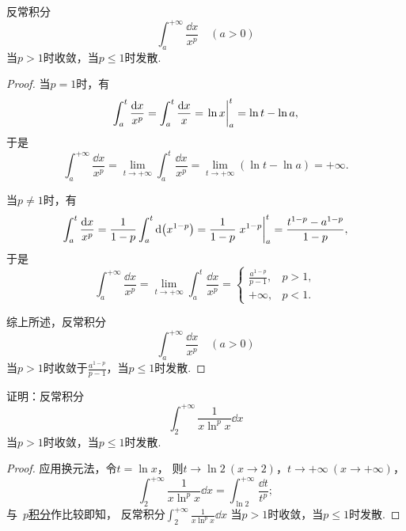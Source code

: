 \begin{proposition}[\(p\)积分]\label{example:定积分.p积分}
反常积分\begin{equation*}
	\int_a^{+\infty} \frac{\dd{x}}{x^p}
	\quad(a>0)
\end{equation*}当\(p>1\)时收敛，当\(p\leq1\)时发散.
\begin{proof}
当\(p=1\)时，有\begin{equation*}
	\int_a^t \frac{\dd{x}}{x^p}
	= \int_a^t \frac{\dd{x}}{x}
	= \eval{\ln x}_a^t
	= \ln t - \ln a,
\end{equation*}
于是\begin{equation*}
	\int_a^{+\infty} \frac{\dd{x}}{x^p}
	= \lim_{t\to+\infty} \int_a^t \frac{\dd{x}}{x^p}
	= \lim_{t\to+\infty} (\ln t - \ln a)
	= +\infty.
\end{equation*}

当\(p\neq1\)时，有\begin{equation*}
	\int_a^t \frac{\dd{x}}{x^p}
	= \frac{1}{1-p} \int_a^t \dd(x^{1-p})
	= \frac{1}{1-p} \eval{x^{1-p}}_a^t
	= \frac{t^{1-p}-a^{1-p}}{1-p},
\end{equation*}
于是\begin{equation*}
	\int_a^{+\infty} \frac{\dd{x}}{x^p}
	= \lim_{t\to+\infty} \int_a^t \frac{\dd{x}}{x^p}
	= \left\{ \begin{array}{cl}
		\frac{a^{1-p}}{p-1}, & p>1, \\
		+\infty, & p<1.
	\end{array} \right.
\end{equation*}

综上所述，反常积分\begin{equation*}
	\int_a^{+\infty} \frac{\dd{x}}{x^p}
	\quad(a>0)
\end{equation*}当\(p>1\)时收敛于\(\frac{a^{1-p}}{p-1}\)，当\(p\leq1\)时发散.
\end{proof}
\end{proposition}

\begin{example}
证明：反常积分\begin{equation*}
	\int_2^{+\infty} \frac{1}{x \ln^p x} \dd{x}
\end{equation*}
当\(p>1\)时收敛，当\(p\leq1\)时发散.
\begin{proof}
应用换元法，令\(t = \ln x\)，
则\(t \to \ln2\ (x\to2)\)，\(t \to +\infty\ (x\to+\infty)\)，
\begin{equation*}
	\int_2^{+\infty} \frac{1}{x \ln^p x} \dd{x}
	= \int_{\ln2}^{+\infty} \frac{\dd{t}}{t^p};
\end{equation*}
与~\hyperref[example:定积分.p积分]{\(p\)积分}作比较即知，
反常积分\(\int_2^{+\infty} \frac{1}{x \ln^p x} \dd{x}\)%
当\(p>1\)时收敛，当\(p\leq1\)时发散.
\end{proof}
\end{example}

